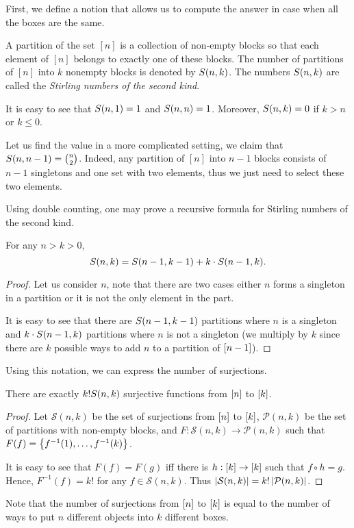 First, we define a notion that allows us to compute the answer in case when
all the boxes are the same.
\begin{definition}
  A partition of the set $[n]$ is a collection of non-empty
  blocks so that each element of $[n]$ belongs to exactly
  one of these blocks. The number of partitions of $[n]$
  into $k$ nonempty blocks is denoted by $S({n}, {k})$.
  The numbers $S({n}, {k})$ are called the \emph{Stirling numbers
  of the second kind}.
\end{definition}

It is easy to see that $S({n}, {1}) = 1$ and $S({n}, {n}) = 1$.
Moreover, $S({n}, {k}) = 0$ if $k > n$ or $k \le 0$.

Let us find the value in a more complicated setting, we
claim that $S({n}, {n - 1}) = \binom{n}{2}$. Indeed, any
partition of $[n]$ into $n - 1$ blocks consists of
$n - 1$ singletons and one set with two elements, thus we
just need to select these two elements.

Using double counting, one may prove a recursive formula
for Stirling numbers of the second kind.
\begin{theorem}
  For any $n > k > 0$,
  \[
    S({n}, {k}) = S({n - 1}, {k - 1}) + k \cdot S({n - 1}, {k}).
  \]
\end{theorem}
\begin{proof}
  Let us consider $n$, note that there are two cases either $n$ forms a
  singleton in a partition or it is not the only element in the part.

  It is easy to see that there are $S({n - 1}, {k - 1})$ partitions where $n$ is
  a singleton and $k \cdot S({n - 1}, {k})$ partitions where $n$ is not a singleton
  (we multiply by $k$ since there are $k$ possible ways to add $n$ to a
  partition of ${[{n - 1}]}$).
\end{proof}

Using this notation, we can express the number of surjections.
\begin{lemma}
  There are exactly $k! S({n}, {k})$ surjective functions from
  ${[{n}]}$ to ${[{k}]}$.
\end{lemma}
\begin{proof}
  Let $\mathcal{S}(n, k)$ be the set of surjections from ${[{n}]}$ to ${[{k}]}$,
  $\mathcal{P}(n, k)$ be the set of partitions with non-empty blocks, and
  $F : \mathcal{S}(n, k) \to \mathcal{P}(n, k)$ such that
  $F(f) = \set{f^{-1}(1), \dots, f^{-1}(k)}$.

  It is easy to see that $F(f) = F(g)$ iff there is $h : {[{k}]} \to {[{k}]}$ 
  such that $f \circ h = g$. Hence, $F^{-1}(f) = k!$ for any $f \in \mathcal{S}(n, k)$.
  Thus $\left|{\mathcal{S}(n, k)}\right| = k! \left|{\mathcal{P}(n, k)}\right|$.
\end{proof}
Note that the number of surjections from ${[{n}]}$ to ${[{k}]}$ is equal to the
number of ways to put $n$ different objects into $k$ different boxes.

